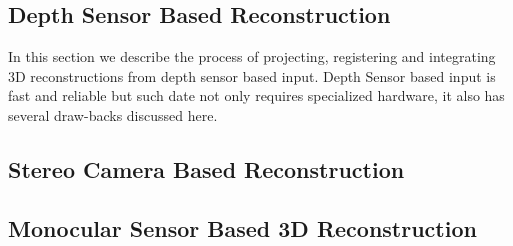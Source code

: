 
\subsection{Depth Sensor Based Reconstruction}

In this section we describe the process of projecting, registering and integrating 3D reconstructions from depth sensor based input. Depth Sensor based input is fast and reliable but such date not only requires specialized hardware, it also has several draw-backs discussed here. 

\subsection{Stereo Camera Based Reconstruction}

\subsection{Monocular Sensor Based 3D Reconstruction}